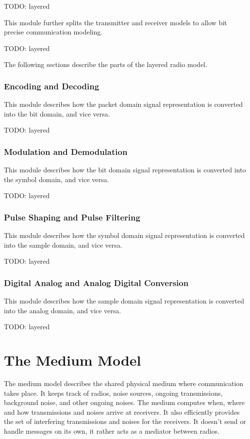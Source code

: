 TODO: layered

This module further splits the transmitter and receiver models to allow bit
precise communication modeling.

TODO: layered

The following sections describe the parts of the layered radio model.

\subsubsection{Encoding and Decoding}

This module describes how the packet domain signal representation is converted
into the bit domain, and vice versa.

TODO: layered

\subsubsection{Modulation and Demodulation}

This module describes how the bit domain signal representation is converted into
the symbol domain, and vice versa.

TODO: layered

\subsubsection{Pulse Shaping and Pulse Filtering}

This module describes how the symbol domain signal representation is converted
into the sample domain, and vice versa.

TODO: layered


\subsubsection{Digital Analog and Analog Digital Conversion}

This module describes how the sample domain signal representation is converted
into the analog domain, and vice versa.

TODO: layered

\section{The Medium Model}

The medium model describes the shared physical medium where communication takes
place. It keeps track of radios, noise sources, ongoing transmissions,
background noise, and other ongoing noises. The medium computes when, where and
how transmissions and noises arrive at receivers. It also efficiently provides
the set of interfering transmissions and noises for the receivers. It doesn't
send or handle messages on its own, it rather acts as a mediator between radios.


